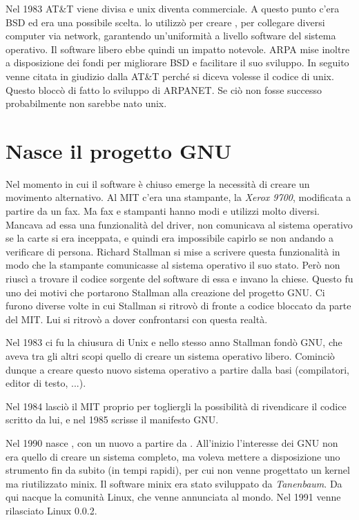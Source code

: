 Nel 1983 AT\&T viene divisa e unix diventa commerciale. A questo punto c'era BSD ed era una possibile scelta.  lo utilizzò per creare , per collegare diversi computer via network, garantendo un'uniformità a livello software del sistema operativo. Il software libero ebbe quindi un impatto notevole. ARPA mise inoltre a disposizione dei fondi per migliorare BSD e facilitare il suo sviluppo. In seguito venne citata in giudizio dalla AT\&T perché si diceva volesse il codice di unix. Questo bloccò di fatto lo sviluppo di ARPANET. Se ciò non fosse successo probabilmente non sarebbe nato unix.

\section{Nasce il progetto GNU}

Nel momento in cui il software è chiuso emerge la necessità di creare un movimento alternativo. Al MIT c'era una stampante, la \textit{Xerox 9700}, modificata a partire da un fax. Ma fax e stampanti hanno modi e utilizzi molto diversi. Mancava ad essa una funzionalità del driver, non comunicava al sistema operativo se la carte si era inceppata, e quindi era impossibile capirlo se non andando a verificare di persona. Richard Stallman si mise a scrivere questa funzionalità in modo che la stampante comunicasse al sistema operativo il suo stato. Però non riuscì a trovare il codice sorgente del software di essa e invano la chiese. Questo fu uno dei motivi che portarono Stallman alla creazione del progetto GNU. Ci furono diverse volte in cui Stallman si ritrovò di fronte a codice bloccato da parte del MIT. Lui si ritrovò a dover confrontarsi con questa realtà.

Nel 1983 ci fu la chiusura di Unix e nello stesso anno Stallman fondò GNU, che aveva tra gli altri scopi quello di creare un sistema operativo libero. Cominciò dunque a creare questo nuovo sistema operativo a partire dalla basi (compilatori, editor di testo, ...).

Nel 1984 lasciò il MIT proprio per togliergli la possibilità di rivendicare il codice scritto da lui, e nel 1985 scrisse il manifesto GNU.

Nel 1990 nasce , con un nuovo  a partire da . All'inizio l'interesse dei GNU non era quello di creare un sistema completo, ma voleva mettere a disposizione uno strumento fin da subito (in tempi rapidi), per cui non venne progettato un kernel ma riutilizzato minix. Il software minix era stato sviluppato da \textit{Tanenbaum}. Da qui nacque la comunità Linux, che venne annunciata al mondo. Nel 1991 venne rilasciato Linux 0.0.2.

